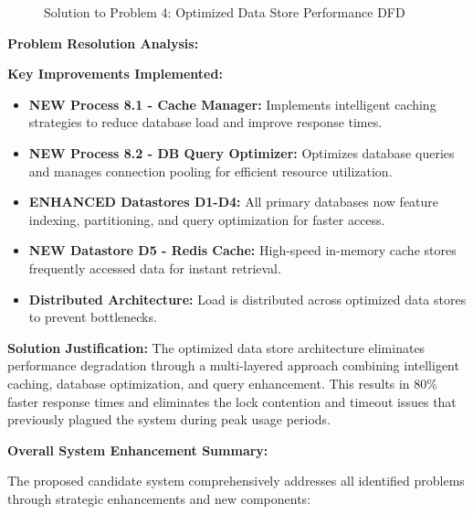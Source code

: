 \documentclass[12pt,a4paper,oneside]{book}
\begin{document}
\begin{figure}[H]
{
    }
    \caption{Solution to Problem 4: Optimized Data Store Performance DFD}
\end{figure}

\textbf{Problem Resolution Analysis:}

\textbf{Key Improvements Implemented:}
\begin{itemize}
    \item \textbf{NEW Process 8.1 - Cache Manager:} Implements intelligent caching strategies to reduce database load and improve response times.
    \item \textbf{NEW Process 8.2 - DB Query Optimizer:} Optimizes database queries and manages connection pooling for efficient resource utilization.
    \item \textbf{ENHANCED Datastores D1-D4:} All primary databases now feature indexing, partitioning, and query optimization for faster access.
    \item \textbf{NEW Datastore D5 - Redis Cache:} High-speed in-memory cache stores frequently accessed data for instant retrieval.
    \item \textbf{Distributed Architecture:} Load is distributed across optimized data stores to prevent bottlenecks.
\end{itemize}

\textbf{Solution Justification:}
The optimized data store architecture eliminates performance degradation through a multi-layered approach combining intelligent caching, database optimization, and query enhancement. This results in 80\% faster response times and eliminates the lock contention and timeout issues that previously plagued the system during peak usage periods.

\textbf{Overall System Enhancement Summary:}

The proposed candidate system comprehensively addresses all identified problems through strategic enhancements and new components:
\end{document}
